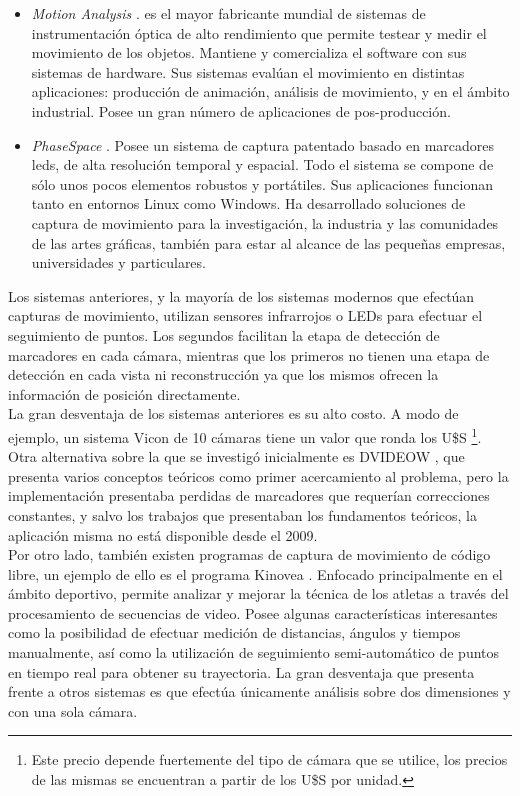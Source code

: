 \begin{itemize}
\item \emph{Motion Analysis} \cite{motion_analysis}. es el mayor fabricante mundial de sistemas de instrumentación óptica de alto rendimiento que permite testear y medir el movimiento de los objetos. Mantiene y comercializa el software con sus sistemas de hardware. Sus sistemas evalúan el movimiento en distintas aplicaciones: producción de animación, análisis de movimiento, y en el ámbito industrial. Posee un gran número de aplicaciones de pos-producción.

\item \emph{PhaseSpace} \cite{phasespace}. Posee un sistema de captura patentado basado en marcadores leds, de alta resolución temporal y espacial. Todo el sistema se compone de sólo unos pocos elementos robustos y portátiles. Sus aplicaciones funcionan tanto en entornos Linux como Windows. Ha desarrollado soluciones de captura de movimiento para la investigación, la industria y las comunidades de las artes gráficas, también para estar al alcance de las pequeñas empresas, universidades y particulares.
\end{itemize}

Los sistemas anteriores, y la mayoría de los sistemas modernos que efectúan capturas de movimiento, utilizan sensores infrarrojos o LEDs para efectuar el seguimiento de puntos. Los segundos facilitan la etapa de detección de marcadores en cada cámara, mientras que los primeros no tienen una etapa de detección en cada vista ni reconstrucción ya que los mismos ofrecen la información de posición directamente.
\\ 

La gran desventaja de los sistemas anteriores es su alto costo. A modo de ejemplo, un sistema Vicon de 10 cámaras tiene un valor que ronda los U\$S \footnote{Este precio depende fuertemente del tipo de cámara que se utilice, los precios de las mismas se encuentran a partir de los U\$S por unidad.}.
\\ 

Otra alternativa sobre la que se investigó inicialmente es DVIDEOW \cite{figueroa2003flexible}, que presenta varios conceptos teóricos como primer acercamiento al problema, pero la implementación presentaba perdidas de marcadores que requerían correcciones constantes, y salvo los trabajos que presentaban los fundamentos teóricos, la aplicación misma no está disponible desde el 2009.
\\ 

Por otro lado, también existen programas de captura de movimiento de código libre, un ejemplo de ello es el programa Kinovea \cite{kinovea}. Enfocado principalmente en el ámbito deportivo, permite analizar y mejorar la técnica de los atletas a través del procesamiento de secuencias de video. Posee algunas características interesantes como la posibilidad de efectuar medición de distancias, ángulos y tiempos manualmente, así como la utilización de seguimiento semi-automático de puntos en tiempo real para obtener su trayectoria. La gran desventaja que presenta frente a otros sistemas es que efectúa únicamente análisis sobre dos dimensiones y con una sola cámara.

